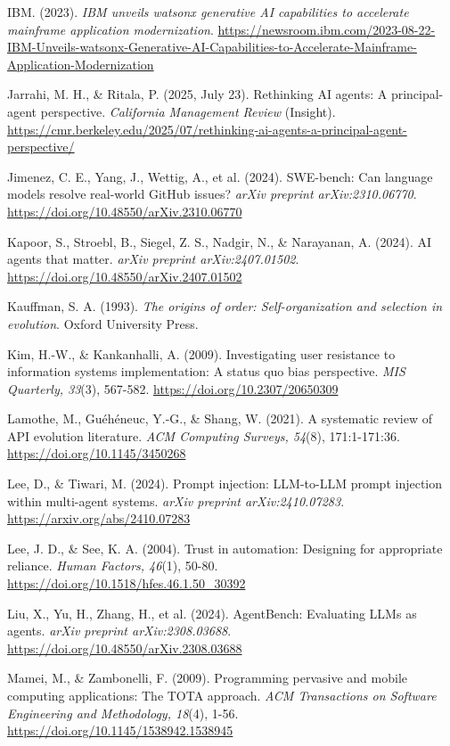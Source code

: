 IBM. (2023). \emph{IBM unveils watsonx generative AI capabilities to
accelerate mainframe application modernization}.
\url{https://newsroom.ibm.com/2023-08-22-IBM-Unveils-watsonx-Generative-AI-Capabilities-to-Accelerate-Mainframe-Application-Modernization}

Jarrahi, M. H., \& Ritala, P. (2025, July 23). Rethinking AI agents: A
principal-agent perspective. \emph{California Management Review}
(Insight).
\url{https://cmr.berkeley.edu/2025/07/rethinking-ai-agents-a-principal-agent-perspective/}

Jimenez, C. E., Yang, J., Wettig, A., et al. (2024). SWE-bench: Can
language models resolve real-world GitHub issues? \emph{arXiv preprint
arXiv:2310.06770}. \url{https://doi.org/10.48550/arXiv.2310.06770}

Kapoor, S., Stroebl, B., Siegel, Z. S., Nadgir, N., \& Narayanan, A.
(2024). AI agents that matter. \emph{arXiv preprint arXiv:2407.01502}.
\url{https://doi.org/10.48550/arXiv.2407.01502}

Kauffman, S. A. (1993). \emph{The origins of order: Self-organization
and selection in evolution}. Oxford University Press.

Kim, H.-W., \& Kankanhalli, A. (2009). Investigating user resistance to
information systems implementation: A status quo bias perspective.
\emph{MIS Quarterly, 33}(3), 567-582.
\url{https://doi.org/10.2307/20650309}

Lamothe, M., Guéhéneuc, Y.-G., \& Shang, W. (2021). A systematic review
of API evolution literature. \emph{ACM Computing Surveys, 54}(8),
171:1-171:36. \url{https://doi.org/10.1145/3450268}

Lee, D., \& Tiwari, M. (2024). Prompt injection: LLM-to-LLM prompt
injection within multi-agent systems. \emph{arXiv preprint
arXiv:2410.07283}. \url{https://arxiv.org/abs/2410.07283}

Lee, J. D., \& See, K. A. (2004). Trust in automation: Designing for
appropriate reliance. \emph{Human Factors, 46}(1), 50-80.
\url{https://doi.org/10.1518/hfes.46.1.50_30392}

Liu, X., Yu, H., Zhang, H., et al. (2024). AgentBench: Evaluating LLMs
as agents. \emph{arXiv preprint arXiv:2308.03688}.
\url{https://doi.org/10.48550/arXiv.2308.03688}

Mamei, M., \& Zambonelli, F. (2009). Programming pervasive and mobile
computing applications: The TOTA approach. \emph{ACM Transactions on
Software Engineering and Methodology, 18}(4), 1-56.
\url{https://doi.org/10.1145/1538942.1538945}

